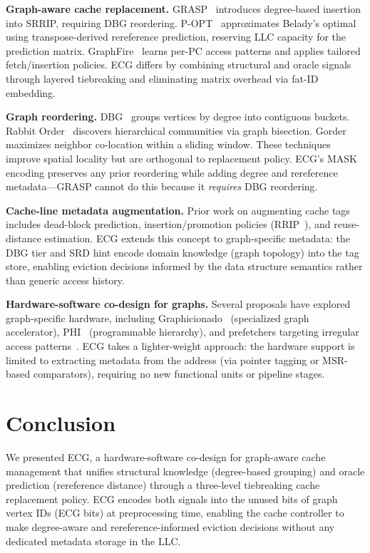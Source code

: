 \documentclass[conference]{IEEEtran}
\begin{document}
\textbf{Graph-aware cache replacement.} GRASP~\cite{faldu_domain-specialized_2020} introduces degree-based insertion into SRRIP, requiring DBG reordering. P-OPT~\cite{balaji_p-opt_2021} approximates Belady's optimal using transpose-derived rereference prediction, reserving LLC capacity for the prediction matrix. GraphFire~\cite{manocha_graphfire_2023} learns per-PC access patterns and applies tailored fetch/insertion policies. ECG differs by combining structural and oracle signals through layered tiebreaking and eliminating matrix overhead via fat-ID embedding.

\textbf{Graph reordering.} DBG~\cite{faldu_closer_2020} groups vertices by degree into contiguous buckets. Rabbit Order~\cite{arai_rabbit_2016} discovers hierarchical communities via graph bisection. Gorder~\cite{wei_speedup_2016} maximizes neighbor co-location within a sliding window. These techniques improve spatial locality but are orthogonal to replacement policy. ECG's MASK encoding preserves any prior reordering while adding degree and rereference metadata---GRASP cannot do this because it \emph{requires} DBG reordering.

\textbf{Cache-line metadata augmentation.} Prior work on augmenting cache tags includes dead-block prediction, insertion/promotion policies (RRIP~\cite{jaleel_high_2010}), and reuse-distance estimation. ECG extends this concept to graph-specific metadata: the DBG tier and SRD hint encode domain knowledge (graph topology) into the tag store, enabling eviction decisions informed by the data structure semantics rather than generic access history.

\textbf{Hardware-software co-design for graphs.} Several proposals have explored graph-specific hardware, including Graphicionado~\cite{ham_graphicionado_2016} (specialized graph accelerator), PHI~\cite{mukkara_exploiting_2018} (programmable hierarchy), and prefetchers targeting irregular access patterns~\cite{basak_analysis_2019}. ECG takes a lighter-weight approach: the hardware support is limited to extracting metadata from the address (via pointer tagging or MSR-based comparators), requiring no new functional units or pipeline stages.

\section{Conclusion}
\label{ECG:Conclusion}

We presented ECG, a hardware-software co-design for graph-aware cache management that unifies structural knowledge (degree-based grouping) and oracle prediction (rereference distance) through a three-level tiebreaking cache replacement policy. ECG encodes both signals into the unused bits of graph vertex IDs (ECG bits) at preprocessing time, enabling the cache controller to make degree-aware and rereference-informed eviction decisions without any dedicated metadata storage in the LLC.
\end{document}
